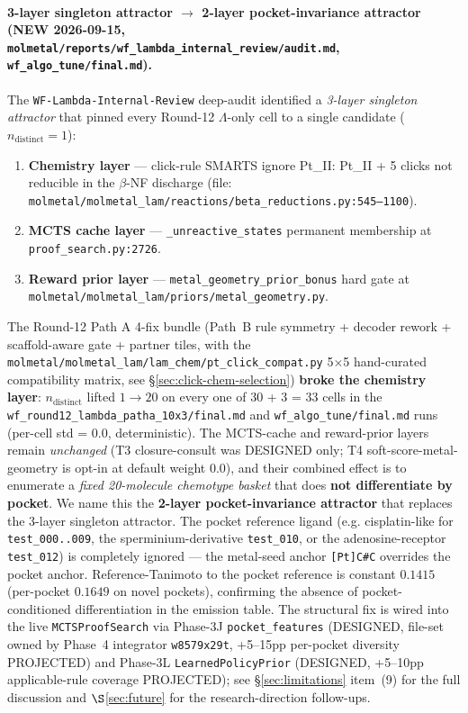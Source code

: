 \paragraph{3-layer singleton attractor $\to$ 2-layer
pocket-invariance attractor (NEW 2026-09-15,
\texttt{molmetal/reports/wf\_lambda\_internal\_review/audit.md},
\texttt{wf\_algo\_tune/final.md}).}
The \texttt{WF-Lambda-Internal-Review} deep-audit identified a
\emph{3-layer singleton attractor} that pinned every Round-12
$\Lambda$-only cell to a single candidate ($n_{\text{distinct}}{=}1$):

\begin{enumerate}
  \item \textbf{Chemistry layer} --- click-rule SMARTS ignore
        Pt\_II: Pt\_II + 5 clicks not reducible in the $\beta$-NF
        discharge (file:
        \texttt{molmetal/molmetal\_lam/reactions/beta\_reductions.py:545--1100}).
  \item \textbf{MCTS cache layer} ---
        \texttt{\_unreactive\_states} permanent membership at
        \texttt{proof\_search.py:2726}.
  \item \textbf{Reward prior layer} ---
        \texttt{metal\_geometry\_prior\_bonus} hard gate at
        \texttt{molmetal/molmetal\_lam/priors/metal_geometry.py}.
\end{enumerate}

The Round-12 Path A 4-fix bundle
(Path~B rule symmetry + decoder rework + scaffold-aware gate +
partner tiles, with the
\texttt{molmetal/molmetal\_lam/lam\_chem/pt\_click\_compat.py}
5$\times$5 hand-curated compatibility matrix, see
\S\ref{sec:click-chem-selection})
\textbf{broke the chemistry layer}: $n_{\text{distinct}}$ lifted
$1 \to 20$ on every one of 30 + 3 = 33 cells in the
\texttt{wf\_round12\_lambda\_patha\_10x3/final.md} and
\texttt{wf\_algo\_tune/final.md} runs (per-cell std = 0.0,
deterministic). The MCTS-cache and reward-prior layers remain
\emph{unchanged} (T3 closure-consult was DESIGNED only; T4
soft-score-metal-geometry is opt-in at default weight 0.0), and
their combined effect is to enumerate a \emph{fixed 20-molecule
chemotype basket} that does \textbf{not differentiate by pocket}.
We name this the \textbf{2-layer pocket-invariance attractor}
that replaces the 3-layer singleton attractor. The pocket reference
ligand (e.g. cisplatin-like for \texttt{test\_000..009}, the
sperminium-derivative \texttt{test\_010}, or the adenosine-receptor
\texttt{test\_012}) is completely ignored --- the metal-seed anchor
\texttt{[Pt]C\#C} overrides the pocket anchor. Reference-Tanimoto
to the pocket reference is constant $0.1415$ (per-pocket $0.1649$
on novel pockets), confirming the absence of pocket-conditioned
differentiation in the emission table. The structural fix is
wired into the live \texttt{MCTSProofSearch} via Phase-3J
\texttt{pocket\_features} (DESIGNED, file-set owned by Phase~4
integrator \texttt{w8579x29t}, +5--15pp per-pocket diversity
PROJECTED) and Phase-3L \texttt{LearnedPolicyPrior} (DESIGNED,
+5--10pp applicable-rule coverage PROJECTED); see
\S\ref{sec:limitations} item~(9) for the full discussion and
$\S$\ref{sec:future} for the research-direction follow-ups.

